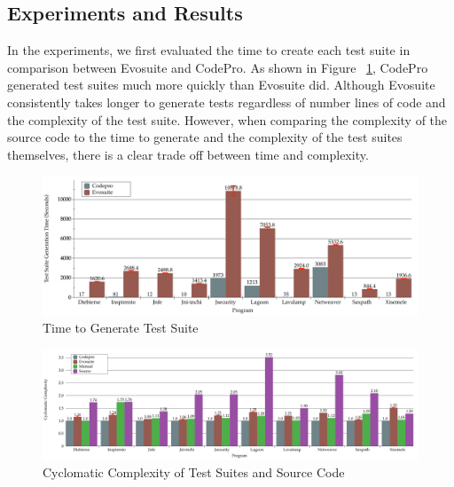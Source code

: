 \documentclass[conference]{IEEEtran}
\begin{document}
\subsection{Experiments and Results}

In the experiments, we first evaluated the time to create each test suite in comparison between Evosuite and CodePro. As shown in Figure ~\ref{fig:Time}, CodePro generated test suites much more quickly than Evosuite did. Although Evosuite consistently takes longer to generate tests regardless of number lines of code and the complexity of the test suite. However, when comparing the complexity of the source code to the time to generate and the complexity of the test suites themselves, there is a clear trade off between time and complexity.

\begin{figure}[!t]
\centering
  \includegraphics[width=\linewidth]{Time}
    \caption{Time to Generate Test Suite}
  \label{fig:Time}
\end{figure}

\begin{figure}[!t]
\centering
  \includegraphics[width=\linewidth]{Complexity}
   \caption{Cyclomatic Complexity of Test Suites and Source Code}
  \label{fig:Complexity}
\end{figure}
\end{document}
